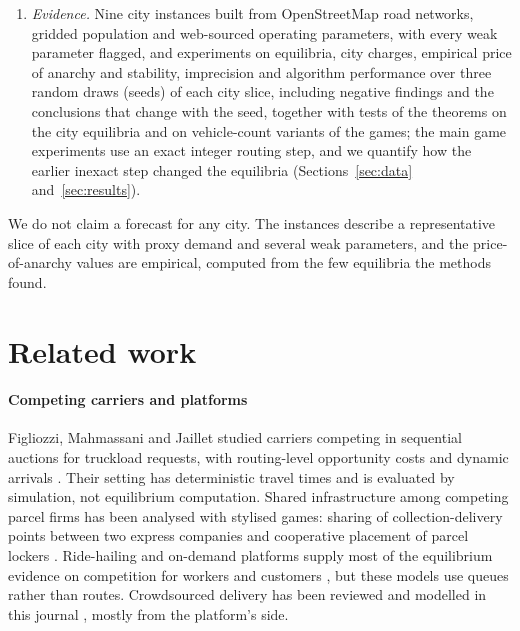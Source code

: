 \documentclass[preprint,12pt]{elsarticle}
\theoremstyle{definition}
\theoremstyle{remark}
\begin{document}
\begin{enumerate}[label=(\roman*),leftmargin=*]
\item \emph{Evidence.} Nine city instances built from OpenStreetMap road networks, gridded population and web-sourced operating parameters, with every weak parameter flagged, and experiments on equilibria, city charges, empirical price of anarchy and stability, imprecision and algorithm performance over three random draws (seeds) of each city slice, including negative findings and the conclusions that change with the seed, together with tests of the theorems on the city equilibria and on vehicle-count variants of the games; the main game experiments use an exact integer routing step, and we quantify how the earlier inexact step changed the equilibria (Sections~\ref{sec:data} and~\ref{sec:results}).
\end{enumerate}
We do not claim a forecast for any city. The instances describe a representative slice of each city with proxy demand and several weak parameters, and the price-of-anarchy values are empirical, computed from the few equilibria the methods found.

\section{Related work}\label{sec:related}

\paragraph{Competing carriers and platforms} Figliozzi, Mahmassani and Jaillet studied carriers competing in sequential auctions for truckload requests, with routing-level opportunity costs and dynamic arrivals \citep{Figliozzi2004,Figliozzi2007}. Their setting has deterministic travel times and is evaluated by simulation, not equilibrium computation. Shared infrastructure among competing parcel firms has been analysed with stylised games: sharing of collection-delivery points between two express companies \citep{Li2024} and cooperative placement of parcel lockers \citep{Mercurio2026}. Ride-hailing and on-demand platforms supply most of the equilibrium evidence on competition for workers and customers \citep{Taylor2018,Bernstein2021,Benjaafar2022}, but these models use queues rather than routes. Crowdsourced delivery has been reviewed and modelled in this journal \citep{Alnaggar2021,Alnaggar2024,Mancini2022,DiPuglia2023}, mostly from the platform's side.
\end{document}
